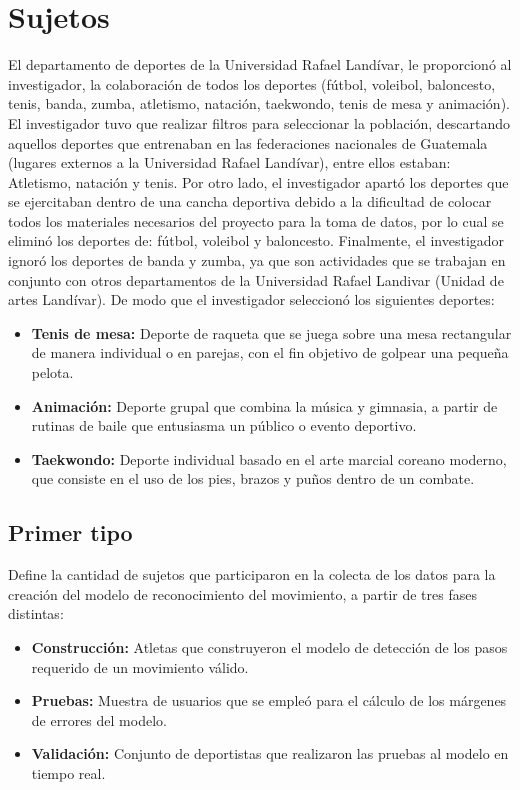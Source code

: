 \section{Sujetos}
El departamento de deportes de la Universidad Rafael Land\'ivar, le proporcion\'o al investigador, la colaboraci\'on de todos los deportes (f\'utbol, voleibol, baloncesto, tenis, banda, zumba, atletismo, nataci\'on, taekwondo, tenis de mesa y animaci\'on).
\medbreak
El investigador tuvo que realizar filtros para seleccionar la poblaci\'on, descartando aquellos deportes que entrenaban en las federaciones nacionales de Guatemala (lugares externos a la Universidad Rafael Land\'ivar), entre ellos estaban: Atletismo, nataci\'on y tenis.
\medbreak
Por otro lado, el investigador apart\'o los deportes que se ejercitaban dentro de una cancha deportiva debido a la dificultad de colocar todos los materiales necesarios del proyecto para la toma de datos, por lo cual se elimin\'o los deportes de:  f\'utbol, voleibol y baloncesto.
\medbreak
Finalmente, el investigador ignor\'o los deportes de banda y zumba, ya que son actividades que se trabajan en conjunto con otros departamentos de la Universidad Rafael Landivar (Unidad de artes Land\'ivar). De modo que el investigador seleccion\'o los siguientes deportes:
\begin{itemize}
	\item \textbf{Tenis de mesa:} Deporte de raqueta que se juega sobre una mesa rectangular de manera individual o en parejas, con el fin objetivo de golpear una peque\~na pelota.
	\item \textbf{Animaci\'on:} Deporte grupal que combina la m\'usica y gimnasia, a partir de rutinas de baile que entusiasma un p\'ublico o evento deportivo.
	\item \textbf{Taekwondo:} Deporte individual basado en el arte marcial coreano moderno, que consiste en el uso de los pies, brazos y pu\~nos dentro de un combate.
\end{itemize}
\subsection{Primer tipo} \label{sj:1t}
Define la cantidad de sujetos que participaron en la colecta de los datos para la creaci\'on del modelo de reconocimiento del movimiento, a partir de tres fases distintas:
\begin{itemize}
	\item \textbf{Construcci\'on:} Atletas que construyeron el modelo de detecci\'on de los pasos requerido de un movimiento v\'alido.
	\item \textbf{Pruebas:} Muestra de usuarios que se emple\'o para el c\'alculo de los m\'argenes de  errores del modelo.
	\item \textbf{Validaci\'on:} Conjunto de deportistas que realizaron las pruebas al modelo en tiempo real.
\end{itemize}
